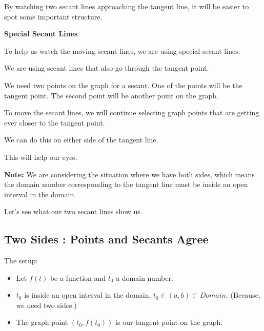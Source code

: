 \documentclass{ximera}
\begin{document}
By watching two secant lines approaching the tangent line, it will be easier to spot some important structure. 






\begin{idea}   \textbf{\textcolor{blue!55!black}{Special Secant Lines}}


To help us watch the moving secant lines, we are using special secant lines. 

We are using secant lines that also go through the tangent point. 

We need two points on the graph for a secant. One of the points will be the tangent point.  The second point will be another point on the graph. 

To move the secant lines, we will continue selecting graph points that are getting ever closer to the tangent point. 

We can do this on either side of the tangent line. 

This will help our eyes.


\end{idea}


\textbf{Note:} We are considering the situation where we have both sides, which means the domain number corresponding to the tangent line must be inside an open interval in the domain. 





Let's see what our two secant lines show us.



















\subsection*{Two Sides : Points and Secants Agree}


The setup: 

\begin{itemize}
     \item Let $f(t)$ be a function and $t_0$ a domain number. 

     \item $t_0$ is inside an open interval in the domain, $t_0 \in (a, b) \subset Domain$. (Because, we need two sides.) 

     \item The graph point $(t_0 , f(t_0))$ is our tangent point on the graph.
\end{itemize}
\end{document}
